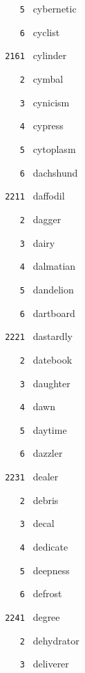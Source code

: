\documentclass[11pt]{article}
\begin{document}
\begin{multicols}{6}
\noindent \texttt{ \ \ \ 5 } cybernetic  \par
\noindent \texttt{ \ \ \ 6 } cyclist  \par
\vspace{3mm}
\noindent \texttt{ 2161 } cylinder  \par
\noindent \texttt{ \ \ \ 2 } cymbal  \par
\noindent \texttt{ \ \ \ 3 } cynicism  \par
\noindent \texttt{ \ \ \ 4 } cypress  \par
\noindent \texttt{ \ \ \ 5 } cytoplasm  \par
\noindent \texttt{ \ \ \ 6 } dachshund  \par
\noindent \texttt{ 2211 } daffodil  \par
\noindent \texttt{ \ \ \ 2 } dagger  \par
\noindent \texttt{ \ \ \ 3 } dairy  \par
\noindent \texttt{ \ \ \ 4 } dalmatian  \par
\noindent \texttt{ \ \ \ 5 } dandelion  \par
\noindent \texttt{ \ \ \ 6 } dartboard  \par
\vspace{3mm}
\noindent \texttt{ 2221 } dastardly  \par
\noindent \texttt{ \ \ \ 2 } datebook  \par
\noindent \texttt{ \ \ \ 3 } daughter  \par
\noindent \texttt{ \ \ \ 4 } dawn  \par
\noindent \texttt{ \ \ \ 5 } daytime  \par
\noindent \texttt{ \ \ \ 6 } dazzler  \par
\vspace{3mm}
\noindent \texttt{ 2231 } dealer  \par
\noindent \texttt{ \ \ \ 2 } debris  \par
\noindent \texttt{ \ \ \ 3 } decal  \par
\noindent \texttt{ \ \ \ 4 } dedicate  \par
\noindent \texttt{ \ \ \ 5 } deepness  \par
\noindent \texttt{ \ \ \ 6 } defrost  \par
\vspace{3mm}
\noindent \texttt{ 2241 } degree  \par
\noindent \texttt{ \ \ \ 2 } dehydrator  \par
\noindent \texttt{ \ \ \ 3 } deliverer  \par

\end{multicols}
\end{document}
